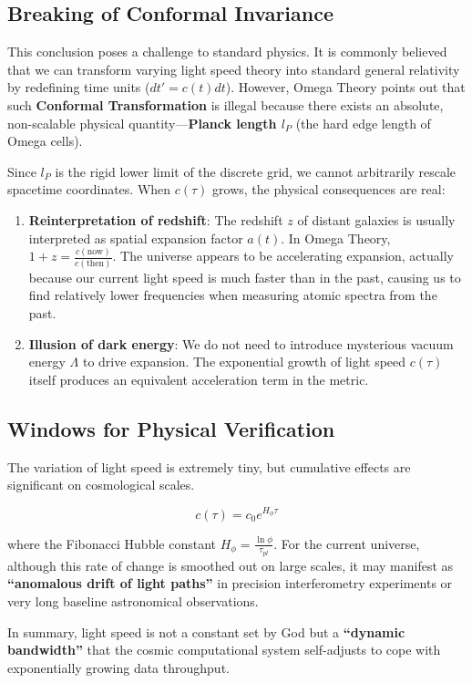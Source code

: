 \subsection{Breaking of Conformal Invariance}

This conclusion poses a challenge to standard physics. It is commonly believed that we can transform varying light speed theory into standard general relativity by redefining time units ($dt' = c(t) dt$). However, Omega Theory points out that such \textbf{Conformal Transformation} is illegal because there exists an absolute, non-scalable physical quantity---\textbf{Planck length $l_P$} (the hard edge length of Omega cells).

Since $l_P$ is the rigid lower limit of the discrete grid, we cannot arbitrarily rescale spacetime coordinates.
When $c(\tau)$ grows, the physical consequences are real:

\begin{enumerate}
\item \textbf{Reinterpretation of redshift}: The redshift $z$ of distant galaxies is usually interpreted as spatial expansion factor $a(t)$. In Omega Theory, $1+z = \frac{c(\text{now})}{c(\text{then})}$. The universe appears to be accelerating expansion, actually because our current light speed is much faster than in the past, causing us to find relatively lower frequencies when measuring atomic spectra from the past.
\item \textbf{Illusion of dark energy}: We do not need to introduce mysterious vacuum energy $\Lambda$ to drive expansion. The exponential growth of light speed $c(\tau)$ itself produces an equivalent acceleration term in the metric.
\end{enumerate}

\subsection{Windows for Physical Verification}

The variation of light speed is extremely tiny, but cumulative effects are significant on cosmological scales.

\[c(\tau) = c_0 e^{H_\phi \tau}\]

where the Fibonacci Hubble constant $H_\phi = \frac{\ln \phi}{\tau_{pl}}$.
For the current universe, although this rate of change is smoothed out on large scales, it may manifest as \textbf{``anomalous drift of light paths''} in precision interferometry experiments or very long baseline astronomical observations.

In summary, light speed is not a constant set by God but a \textbf{``dynamic bandwidth''} that the cosmic computational system self-adjusts to cope with exponentially growing data throughput.
